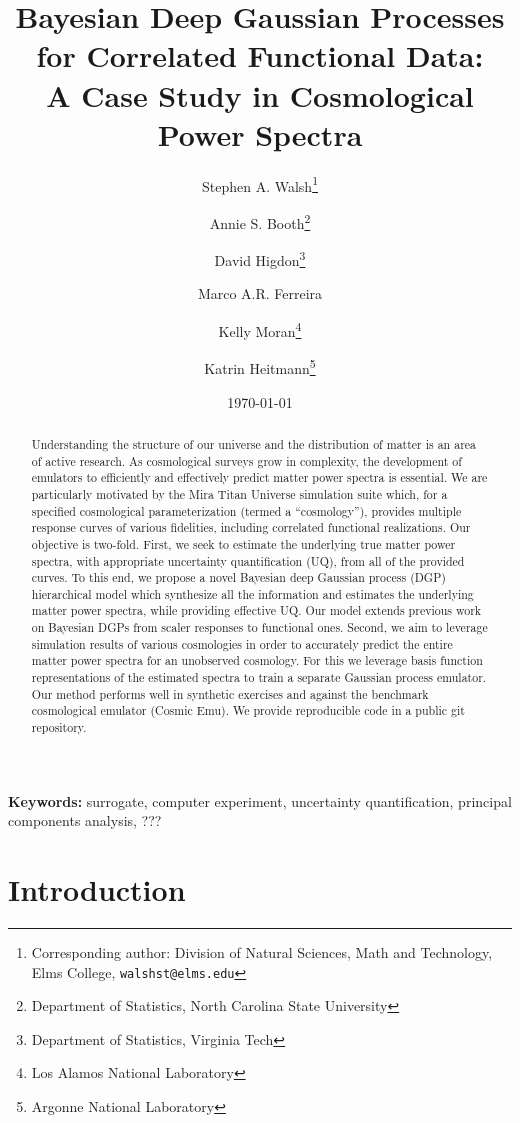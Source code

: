 \documentclass[11pt]{article}
\title{Bayesian Deep Gaussian Processes for Correlated Functional Data: \\
        A Case Study in Cosmological Power Spectra}
\author{Stephen A. Walsh\thanks{Corresponding author: Division of Natural Sciences, 
        Math and Technology, Elms College, {\tt walshst@elms.edu}} \and 
        Annie S. Booth\thanks{Department of Statistics, North Carolina State University} \and
        David Higdon\thanks{Department of Statistics, Virginia Tech} \and
        Marco A.R. Ferreira\footnotemark[3] \and
        Kelly Moran\thanks{Los Alamos National Laboratory} \and
        Katrin Heitmann\thanks{Argonne National Laboratory}}
\date{\today}
\begin{document}
\maketitle
\bigskip

\begin{abstract} 
Understanding the structure of our universe and the distribution of matter is an 
area of active research.  As cosmological surveys grow in complexity, the development 
of emulators to efficiently and effectively predict matter power spectra is essential.  
We are particularly motivated by the Mira Titan Universe simulation
suite which, for a specified cosmological parameterization (termed a ``cosmology''), 
provides multiple response curves of various fidelities, including correlated 
functional realizations.  Our objective is two-fold.  First, we seek to 
estimate the underlying true matter power spectra, with appropriate uncertainty 
quantification (UQ), from all of the provided curves.  To this end, we propose a 
novel Bayesian deep Gaussian process (DGP) hierarchical model which synthesize 
all the information and estimates the underlying matter power spectra, while providing 
effective UQ.  Our model extends previous work on Bayesian DGPs from scaler responses 
to functional ones.  Second, we aim to leverage simulation results of various 
cosmologies in order to accurately predict the entire matter power spectra for an 
unobserved cosmology.  For this we leverage basis function representations 
of the estimated spectra to train a separate Gaussian process emulator.  
Our method performs well in synthetic exercises and against the benchmark cosmological 
emulator (Cosmic Emu).  We provide reproducible code in a public git repository.
\end{abstract}

\noindent \textbf{Keywords:} surrogate, computer experiment, uncertainty quantification,
principal components analysis, ???


\section{Introduction}

\end{document}
